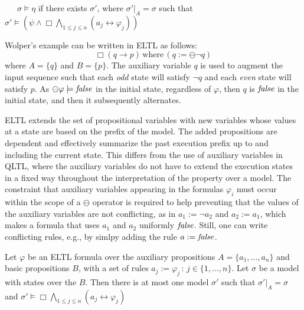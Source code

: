 \begin{tabbing}
\ \ \ $\sigma \models \eta$ \=  if there exists $\sigma'$, where
$\sigma' |_A = \sigma$ such that \\
 \> $\sigma' \models ( \psi  \wedge   \Box \bigwedge_{1 \leq j \leq n} ( a_j \leftrightarrow \varphi_j)) $
\end{tabbing}

\noindent
Wolper's example can be written in ELTL
as follows:
\begin{equation} 
\label{form3}
\Box ( q \rightarrow p ) \, \mathrm{where} \, 
 ( q := \ominus \neg q)
\end{equation}
where $A = \{ q\}$ and $B = \{ p \}$.
The auxiliary variable $q$ is used to augment the input sequence such that each {\em odd} state will satisfy $\neg q$
and each {\em even} state will satisfy $p$.  As $\ominus \varphi \models \mathit{false}$ in the initial state, regardless of $\varphi$, then
$q$ is $\mathit{false}$ in the initial state, and then it subsequently alternates.


ELTL extends the set of propositional variables with new variables whose values at a state are
based on the prefix of the model. The added propositions are dependent and effectively summarize the past execution prefix up to and
including the current state.
This differs from 
the use of auxiliary variables in QLTL, where the auxiliary variables do not have to extend the execution
states in a fixed way throughout the interpretation of 
the property over a model. The constraint that auxiliary variables appearing in the formulas $\varphi_i$ 
must occur within the scope of a $\ominus$ operator
is required to help preventing that the values
of the auxiliary variables are not conflicting, as in
$a_1 := \neg a_2$ and $a_2 := a_1$, which makes a formula
that uses $a_1$ and $a_2$ uniformly $\mathit{false}$. Still, one can write conflicting rules, e.g., by simlpy 
adding the rule $a: = \mathit{false}$.

\begin{lemma} \label{fourone}
Let $\varphi$ be an ELTL formula
over the auxiliary propositions $A = \{ a_1 , \ldots , a_n \}$ and basic propositions $B$, with
a set of rules $a_j  := \varphi_j \, : \, 
 {j \in \{1, \ldots , n\}}$. 
Let $\sigma$ be a model with states over the $B$. 
Then there is at most one
model $\sigma'$ such that $\sigma' |_A = \sigma$ and $\sigma' \models \Box \bigwedge_{1 \leq j \leq n} ( a_j \leftrightarrow \varphi_j) $


\end{lemma}

